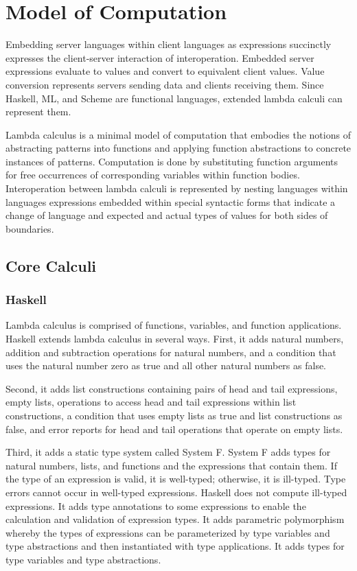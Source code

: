 \chapter{Model of Computation}

Embedding server languages within client languages as expressions succinctly expresses the client-server interaction of interoperation.  Embedded server expressions evaluate to values and convert to equivalent client values.  Value conversion represents servers sending data and clients receiving them.  Since Haskell, ML, and Scheme are functional languages, extended lambda calculi can represent them.

Lambda calculus is a minimal model of computation that embodies the notions of abstracting patterns into functions and applying function abstractions to concrete instances of patterns.  Computation is done by substituting function arguments for free occurrences of corresponding variables within function bodies.  Interoperation between lambda calculi is represented by nesting languages within languages expressions embedded within special syntactic forms that indicate a change of language and expected and actual types of values for both sides of boundaries.

\section{Core Calculi}

\subsection{Haskell}

Lambda calculus is comprised of functions, variables, and function applications.  Haskell extends lambda calculus in several ways.  First, it adds natural numbers, addition and subtraction operations for natural numbers, and a condition that uses the natural number zero as true and all other natural numbers as false.

Second, it adds list constructions containing pairs of head and tail expressions, empty lists, operations to access head and tail expressions within list constructions, a condition that uses empty lists as true and list constructions as false, and error reports for head and tail operations that operate on empty lists.

Third, it adds a static type system called System F.  System F adds types for natural numbers, lists, and functions and the expressions that contain them.  If the type of an expression is valid, it is well-typed; otherwise, it is ill-typed.  Type errors cannot occur in well-typed expressions.  Haskell does not compute ill-typed expressions.  It adds type annotations to some expressions to enable the calculation and validation of expression types.  It adds parametric polymorphism whereby the types of expressions can be parameterized by type variables and type abstractions and then instantiated with type applications.  It adds types for type variables and type abstractions.

